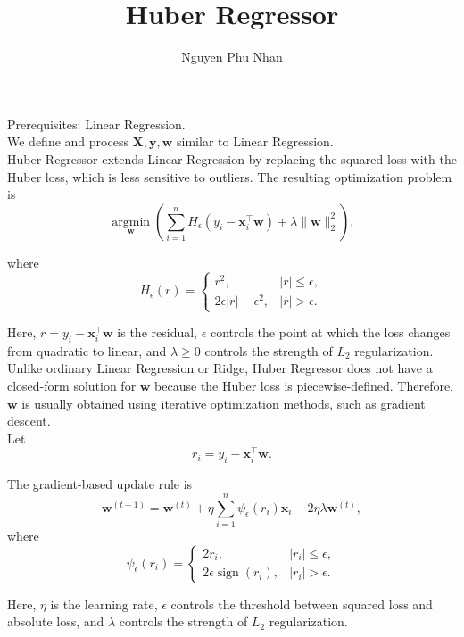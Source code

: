 \documentclass[14pt]{extarticle}
\title{Huber Regressor}
\author{Nguyen Phu Nhan}
\date{}
\begin{document}
\maketitle

Prerequisites: Linear Regression. \\

We define and process $\mathbf{X}, \mathbf{y}, \mathbf{w}$ similar to Linear Regression. \\

Huber Regressor extends Linear Regression by replacing the squared loss with the Huber loss, which is less sensitive to outliers. The resulting optimization problem is
\[
\operatorname*{argmin}_{\mathbf{w}}\left(\sum_{i=1}^{n} H_{\epsilon}\left(y_i - \mathbf{x}_i^\top \mathbf{w}\right) + \lambda \|\mathbf{w}\|_2^2\right),
\]

where
\[
H_{\epsilon}(r)=
\begin{cases}
r^2, & |r| \le \epsilon, \\
2\epsilon |r| - \epsilon^2, & |r| > \epsilon.
\end{cases}
\]

Here, $r = y_i - \mathbf{x}_i^\top \mathbf{w}$ is the residual, $\epsilon$ controls the point at which the loss changes from quadratic to linear, and $\lambda \ge 0$ controls the strength of $L_2$ regularization. \\

Unlike ordinary Linear Regression or Ridge, Huber Regressor does not have a closed-form solution for $\mathbf{w}$ because the Huber loss is piecewise-defined. Therefore, $\mathbf{w}$ is usually obtained using iterative optimization methods, such as gradient descent. \\

Let
\[
r_i = y_i - \mathbf{x}_i^\top \mathbf{w}.
\]

The gradient-based update rule is
\[
\mathbf{w}^{(t+1)} = \mathbf{w}^{(t)} + \eta\sum_{i=1}^{n}\psi_{\epsilon}(r_i)\mathbf{x}_i - 2\eta\lambda \mathbf{w}^{(t)},
\]
where
\[
\psi_{\epsilon}(r_i) =
\begin{cases}
2r_i, & |r_i| \le \epsilon, \\
2\epsilon \operatorname{sign}(r_i), & |r_i| > \epsilon.
\end{cases}
\]

Here, $\eta$ is the learning rate, $\epsilon$ controls the threshold between squared loss and absolute loss, and $\lambda$ controls the strength of $L_2$ regularization.
\end{document}

